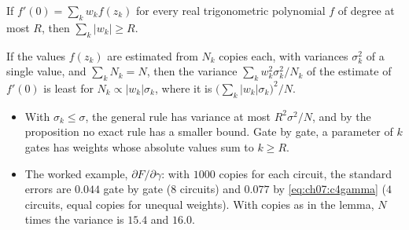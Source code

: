 \documentclass[handoutsbeamer.tex]{subfiles}
\begin{document}
\begin{frame}
\onp{\scriptsize}
\begin{propn}\label{propn:ch07:l1}
If $f'(0) = \sum_kw_kf(z_k)$ for every real trigonometric polynomial $f$ of degree at most $R$, then $\sum_k|w_k|\ge R$.
\end{propn}
\begin{lem}\label{lem:ch07:alloc}
If the values $f(z_k)$ are estimated from $N_k$ copies each, with variances $\sigma_k^2$ of a single value, and $\sum_kN_k = N$, then the variance $\sum_kw_k^2\sigma_k^2/N_k$ of the estimate of $f'(0)$ is least for $N_k\propto|w_k|\sigma_k$, where it is $\big(\sum_k|w_k|\sigma_k\big)^2/N$.
\end{lem}
\begin{itemize}\setlength\itemsep{0.2em}
    \item With $\sigma_k\le\sigma$, the general rule has variance at most $R^2\sigma^2/N$, and by the proposition no exact rule has a smaller bound. Gate by gate, a parameter of $k$ gates has weights whose absolute values sum to $k\ge R$.
    \item The worked example, $\partial F/\partial\gamma$: with $1000$ copies for each circuit, the standard errors are $0.044$ gate by gate ($8$ circuits) and $0.077$ by \eqref{eq:ch07:c4gamma} ($4$ circuits, equal copies for unequal weights). With copies as in the lemma, $N$ times the variance is $15.4$ and $16.0$.
\end{itemize}
\end{frame}
\end{document}
